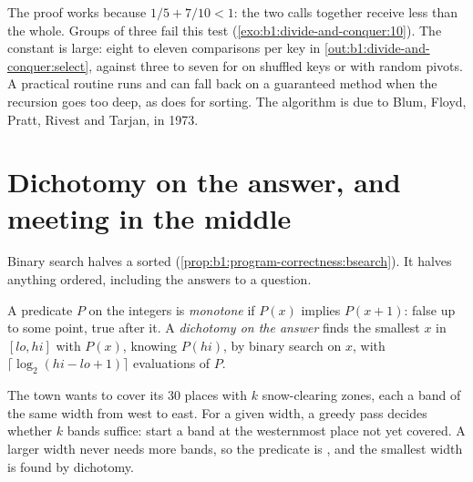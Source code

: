 The proof works because $1/5 + 7/10 < 1$: the two calls together receive less than the whole. Groups of three fail
this test (\cref{exo:b1:divide-and-conquer:10}). The constant is large: eight to eleven comparisons per key in
\cref{out:b1:divide-and-conquer:select}, against three to seven for  on shuffled keys or with random
pivots. A practical routine runs  and can fall back on a guaranteed method when the recursion goes too deep,
as  does for sorting. The algorithm is due to Blum, Floyd, Pratt, Rivest and Tarjan, in 1973.

\section{Dichotomy on the answer, and meeting in the middle}\label{sec:b1:divide-and-conquer:dichotomy}

Binary search halves a sorted  (\cref{prop:b1:program-correctness:bsearch}). It halves anything ordered, including
the answers to a question.

\begin{definition}\label{def:b1:divide-and-conquer:dichotomy}
A predicate $P$ on the integers is \emph{monotone} if $P(x)$ implies $P(x + 1)$: false up to
some point, true after it. A \emph{dichotomy on the answer} finds the smallest $x$ in
$[lo, hi]$ with $P(x)$, knowing $P(hi)$, by binary search on $x$, with $\lceil \log_2 (hi - lo + 1) \rceil$ evaluations
of $P$.
\end{definition}

The town wants to cover its 30 places with $k$ snow-clearing zones, each a band of the same width from west to east.
For a given width, a greedy pass decides whether $k$ bands suffice: start a band at the westernmost place not yet
covered. A larger width never needs more bands, so the predicate is , and the smallest width is found by
dichotomy.

\label{lst:b1:divide-and-conquer:segments}

\label{out:b1:divide-and-conquer:segments}

